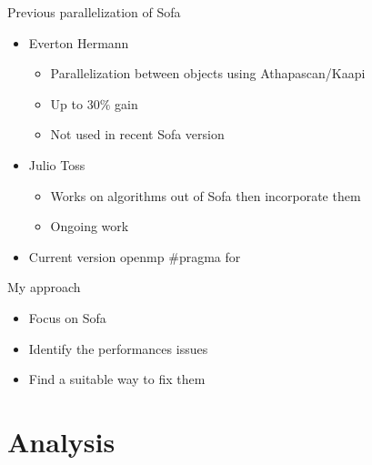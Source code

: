 \documentclass[xcolor={usenames,dvipsnames}]{beamer}
\newcommand{\sectiontitle}{}
\newcommand{\newsection}[1]{\renewcommand{\sectiontitle}{#1}\section{#1}}
\begin{document}
\begin{frame}{Previous parallelization of Sofa}
    \begin{itemize}[<+->]
        \item Everton Hermann\cite{Hermann10Simulations} \\
            \begin{itemize}
                \item Parallelization between objects using Athapascan/Kaapi
                \item Up to $30\%$ gain 
                \item Not used in recent Sofa version 
            \end{itemize}
        \item Julio Toss \cite{Toss12New}
            \begin{itemize}
                \item Works on algorithms out of Sofa then incorporate them
                \item Ongoing work
            \end{itemize}
        \item Current version openmp \#pragma for
    \end{itemize}
    \pause
    \begin{alertblock}{My approach}
        \begin{itemize}
            \item Focus on Sofa 
            \item \alert{Identify the performances issues}
            \item Find a suitable way to fix them
        \end{itemize}
    \end{alertblock}

\end{frame}

\newsection{Analysis}
\end{document}
